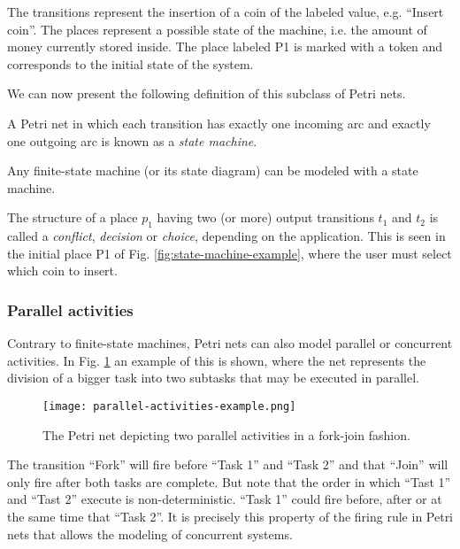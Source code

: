 The transitions represent the insertion of a coin of the labeled value, e.g. ``Insert  coin''.
The places represent a possible state of the machine, i.e. the amount of money currently stored inside.
The place labeled \uppercase{P1} is marked with a token and corresponds to the initial state of the system.

We can now present the following definition of this subclass of Petri nets.

\begin{definition}
    A Petri net in which each transition has exactly one incoming arc
    and exactly one outgoing arc is known as a \textit{state machine}.

    Any finite-state machine (or its state diagram) can be modeled with a state machine.
\end{definition}

The structure of a place $p_1$ having two (or more) output transitions $t_1$ and $t_2$ is called
a \textit{conflict}, \textit{decision} or \textit{choice}, depending on the application.
This is seen in the initial place \uppercase{P1} of Fig. \ref{fig:state-machine-example},
where the user must select which coin to insert.

\subsubsection{Parallel activities}

Contrary to finite-state machines, Petri nets can also model parallel or concurrent activities.
In Fig. \ref{fig:parallel-activities-example} an example of this is shown,
where the net represents the division of a bigger task into two subtasks that may be executed in parallel.

\begin{figure}[H]
    \centering
    \texttt{[image: parallel-activities-example.png]}
    \caption{The Petri net depicting two parallel activities in a fork-join fashion.}
    \label{fig:parallel-activities-example}
\end{figure}

The transition ``Fork'' will fire before ``Task 1'' and ``Task 2''
and that ``Join'' will only fire after both tasks are complete.
But note that the order in which ``Tast 1'' and ``Tast 2'' execute is non-deterministic.
``Task 1'' could fire before, after or at the same time that ``Task 2''.
It is precisely this property of the firing rule in Petri nets that allows the modeling of concurrent systems.

